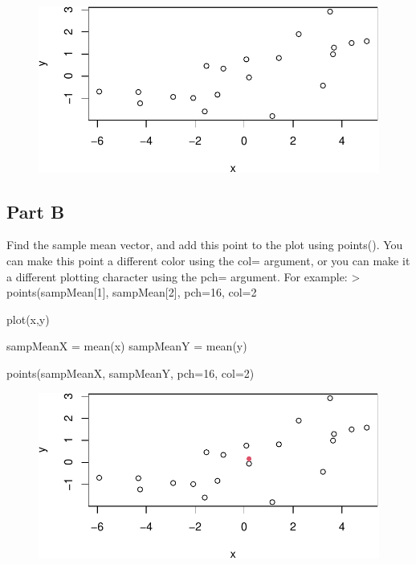 \documentclass[
  letterpaper,
  DIV=11,
  numbers=noendperiod]{scrartcl}
\newenvironment{Shaded}{}{}
\newcommand{\AttributeTok}[1]{\textcolor[rgb]{0.84,0.60,0.13}{#1}}
\newcommand{\DecValTok}[1]{\textcolor[rgb]{0.96,0.45,0.00}{#1}}
\newcommand{\FunctionTok}[1]{\textcolor[rgb]{0.41,0.62,0.42}{#1}}
\newcommand{\NormalTok}[1]{\textcolor[rgb]{0.24,0.22,0.21}{#1}}
\newcommand{\OtherTok}[1]{\textcolor[rgb]{0.41,0.62,0.42}{#1}}
\begin{document}
\begin{figure}[H]

{\centering \includegraphics{CervantesAlvarez_Brian_HW1_ST557_files/figure-pdf/unnamed-chunk-2-1.pdf}

}

\end{figure}

\newpage{}

\hypertarget{part-b}{%
\subsection{Part B}\label{part-b}}

Find the sample mean vector, and add this point to the plot using
points(). You can make this point a different color using the col=
argument, or you can make it a different plotting character using the
pch= argument. For example: \textgreater{} points(sampMean{[}1{]},
sampMean{[}2{]}, pch=16, col=2

\begin{Shaded}
\begin{Highlighting}[]
\FunctionTok{plot}\NormalTok{(x,y)}

\NormalTok{sampMeanX }\OtherTok{=} \FunctionTok{mean}\NormalTok{(x)}
\NormalTok{sampMeanY }\OtherTok{=} \FunctionTok{mean}\NormalTok{(y)}

\FunctionTok{points}\NormalTok{(sampMeanX, sampMeanY, }\AttributeTok{pch=}\DecValTok{16}\NormalTok{, }\AttributeTok{col=}\DecValTok{2}\NormalTok{)}
\end{Highlighting}
\end{Shaded}

\begin{figure}[H]

{\centering \includegraphics{CervantesAlvarez_Brian_HW1_ST557_files/figure-pdf/unnamed-chunk-3-1.pdf}

}

\end{figure}
\end{document}

